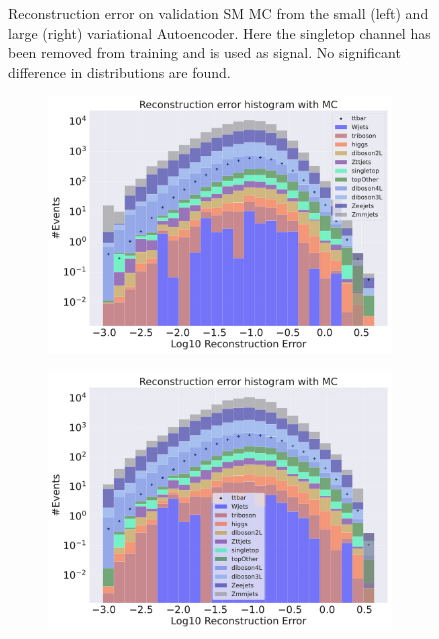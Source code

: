 \begin{figure}[h!]
\begin{subfigure}{.45\textwidth}
        \caption{ }
        \label{fig:vae_big_singletop}
    \end{subfigure}
    \hfill 
    \caption[VAE | Reconstruction error using Singletop channel as signal]{Reconstruction error on validation SM MC from the small (left) and large (right) variational Autoencoder. Here the singletop channel has been removed from training and 
    is used as signal. No significant difference in distributions are found. }
    \label{fig:vae_big_channel_2}
\end{figure}

\begin{figure}[h!]
    \centering
    \begin{subfigure}{.45\textwidth}
        \includegraphics[width=\textwidth]{Figures/VAE_testing/small/b_data_recon_big_rm3_feats_sig_ttbar.pdf}
        \caption{}
        \label{fig:vae_small_ttbar}
    \end{subfigure}
    \hfill 
    \begin{subfigure}{.45\textwidth}
        \includegraphics[width=\textwidth]{Figures/VAE_testing/big/b_data_recon_big_rm3_feats_sig_ttbar.pdf}

\end{subfigure}
\end{figure}
